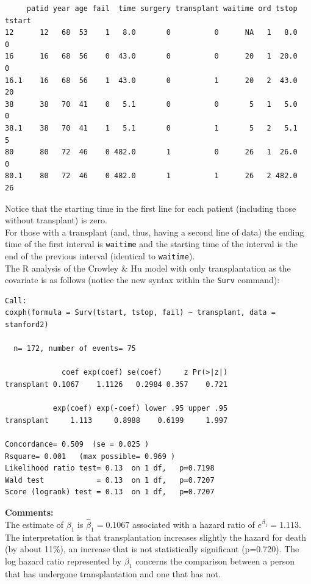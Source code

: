 \documentclass[10pt]{book}
\begin{document}
\small
\begin{verbatim}
     patid year age fail  time surgery transplant waitime ord tstop tstart
12      12   68  53    1   8.0       0          0      NA   1   8.0      0
16      16   68  56    0  43.0       0          0      20   1  20.0      0
16.1    16   68  56    1  43.0       0          1      20   2  43.0     20
38      38   70  41    0   5.1       0          0       5   1   5.0      0
38.1    38   70  41    1   5.1       0          1       5   2   5.1      5
80      80   72  46    0 482.0       1          0      26   1  26.0      0
80.1    80   72  46    0 482.0       1          1      26   2 482.0     26
\end{verbatim}
\normalsize
Notice that the starting time in the first line for each patient (including those without transplant) is zero.  \\[2ex]
For those with a transplant (and, thus, having a second line of data) the ending time of the first interval is {\tt waitime} and the starting time of the interval is the end of the previous interval (identical to {\tt waitime}).
\\[2ex]
The R analysis of the Crowley \& Hu model with only transplantation as the covariate is as follows (notice the new syntax within the {\tt Surv} command):

\small
\begin{verbatim}
Call:
coxph(formula = Surv(tstart, tstop, fail) ~ transplant, data = stanford2)

  n= 172, number of events= 75

             coef exp(coef) se(coef)     z Pr(>|z|)
transplant 0.1067    1.1126   0.2984 0.357    0.721

           exp(coef) exp(-coef) lower .95 upper .95
transplant     1.113     0.8988    0.6199     1.997

Concordance= 0.509  (se = 0.025 )
Rsquare= 0.001   (max possible= 0.969 )
Likelihood ratio test= 0.13  on 1 df,   p=0.7198
Wald test            = 0.13  on 1 df,   p=0.7207
Score (logrank) test = 0.13  on 1 df,   p=0.7207

\end{verbatim}
\normalsize
{\bf Comments:}
\\[2ex]
The estimate of $\beta_1$ is $\hat\beta_1=0.1067$ associated with a hazard ratio
of $e^{\beta_1}=1.113$.
\\[2ex]
The interpretation is that transplantation increases slightly the hazard for death  (by about
11\%), an increase that is not statistically significant (p=0.720). The log hazard ratio represented by $\beta_1$ concerns the comparison between a person that has undergone transplantation and one that has not.
\end{document}
